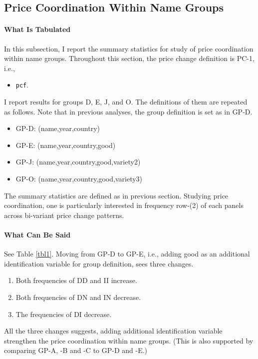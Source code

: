 \subsection{Price Coordination Within Name Groups}

\paragraph{What Is Tabulated}

In this subsection, I report the summary statistics for study of price coordination within name groups. Throughout this section, the price change definition is PC-1, i.e.,
\begin{itemize}
	\item \texttt{pcf}.
\end{itemize}
I report results for groups D, E, J, and O. The definitions of them are repeated as follows. Note that in previous analyses, the group definition is set as in GP-D.
\begin{itemize}
	\item GP-D: (name,year,country)
	\item GP-E: (name,year,country,good)
	\item GP-J: (name,year,country,good,variety2)
	\item GP-O: (name,year,country,good,variety3)
\end{itemize}
The summary statistics are defined as in previous section. Studying price coordination, one is particularly interested in frequency row-(2) of each panels across bi-variant price change patterns.

\paragraph{What Can Be Said}

See Table \ref{tbl1}. Moving from GP-D to GP-E, i.e., adding good as an additional identification variable for group definition, sees three changes.
\begin{enumerate}
	\item Both frequencies of DD and II increase.
	\item Both frequencies of DN and IN decrease.
	\item The frequencies of DI decrease.
\end{enumerate}
All the three changes suggests, adding additional identification variable strengthen the price coordination within name groups. (This is also supported by comparing GP-A, -B and -C to GP-D and -E.)

